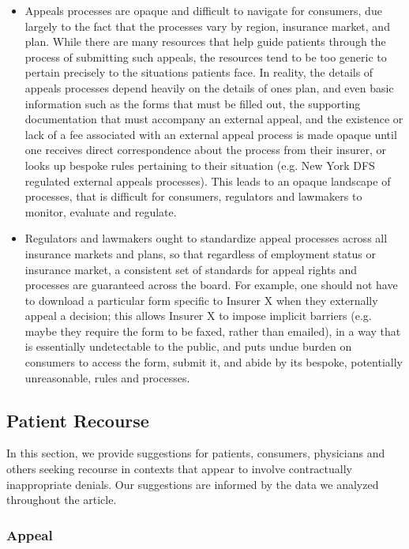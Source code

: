 \documentclass[12pt, a4paper,twoside]{report}
\theoremstyle{plain} %
\theoremstyle{definition} %
\theoremstyle{remark} %
\numberwithin{equation}{chapter}
\begin{document}
		\begin{itemize}
			\item Appeals processes are opaque and difficult to navigate for consumers, due largely to the fact that the processes vary by region, insurance market, and plan. While there are many resources that help guide patients through the process of submitting such appeals, the resources tend to be too generic to pertain precisely to the situations patients face. In reality, the details of appeals processes depend heavily on the details of ones plan, and even basic information such as the forms that must be filled out, the supporting documentation that must accompany an external appeal, and the existence or lack of a fee associated with an external appeal process is made opaque until one receives direct correspondence about the process from their insurer, or looks up bespoke rules pertaining to their situation (e.g. New York DFS regulated external appeals processes). This leads to an opaque landscape of processes, that is difficult for consumers, regulators and lawmakers to monitor, evaluate and regulate.
			
			\item Regulators and lawmakers ought to standardize appeal processes across all insurance markets and plans, so that regardless of employment status or insurance market, a consistent set of standards for appeal rights and processes are guaranteed across the board. For example, one should not have to download a particular form specific to Insurer X when they externally appeal a decision; this allows Insurer X to impose implicit barriers (e.g. maybe they require the form to be faxed, rather than emailed), in a way that is essentially undetectable to the public, and puts undue burden on consumers to access the form, submit it, and abide by its bespoke, potentially unreasonable, rules and processes.
		\end{itemize}
		
		\subsection{Patient Recourse}
		
		In this section, we provide suggestions for patients, consumers, physicians and others seeking recourse in contexts that appear to involve contractually inappropriate denials. Our suggestions are informed by the data we analyzed throughout the article.
		
		\subsubsection{Appeal}
		
\end{document}
